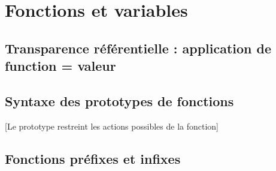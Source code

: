 \section{Fonctions et variables}
\label{sec:functions-variables}

\subsection{ Transparence référentielle : application de function = valeur}

\subsection{ Syntaxe des prototypes de fonctions}

[Le prototype restreint les actions possibles de la fonction]

\subsection{ Fonctions préfixes et infixes}
